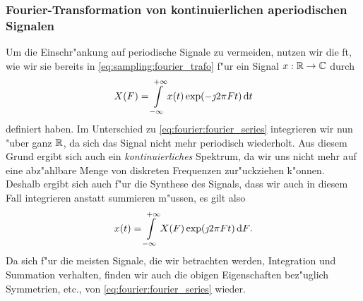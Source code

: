 \subsubsection{Fourier-Transformation von kontinuierlichen aperiodischen Signalen}
%
Um die Einschr"ankung auf periodische Signale zu vermeiden, nutzen wir die \acrlong{ft}, wie wir sie bereits in \eqref{eq:sampling:fourier_trafo} f"ur ein Signal $x : \mathbb{R} \rightarrow \mathbb{C}$ durch
\begin{equation}\label{eq:fourier:fourier_trafo}
    X(F) = {\int\limits_{-\infty}^{+\infty}{x(t) \exp(-\jmath 2 \pi F t)}\,\mathrm{d}{t}}
\end{equation}
definiert haben.
Im Unterschied zu \eqref{eq:fourier:fourier_series} integrieren wir nun "uber ganz $\mathbb{R}$, da sich das Signal nicht mehr periodisch wiederholt.
Aus diesem Grund ergibt sich auch ein \emph{kontinuierliches} Spektrum, da wir uns nicht mehr auf eine abz"ahlbare Menge von diskreten Frequenzen zur"uckziehen k"onnen.
Deshalb ergibt sich auch f"ur die Synthese des Signals, dass wir auch in diesem Fall integrieren anstatt summieren m"ussen, es gilt also
\begin{equation}\label{eq:fourier:inv_fourier_trafo}
    x(t) = {\int\limits_{-\infty}^{+\infty}{X(F) \exp(\jmath 2 \pi F t)}\,\mathrm{d}{F}}.
\end{equation}
Da sich f"ur die meisten Signale, die wir betrachten werden, Integration und Summation  verhalten, finden wir auch die obigen Eigenschaften bez"uglich Symmetrien, etc., von \eqref{eq:fourier:fourier_series} wieder.

